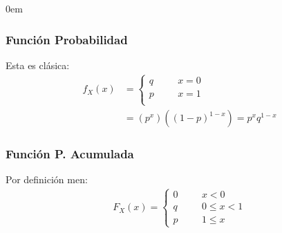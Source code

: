\documentclass[12pt, fleqn]{report}                             %
\newenvironment{SmallIndentation}[1][0.75em]                    %
        {\begin{adjustwidth}{#1}{}\begin{footnotesize}}             %
        {\end{footnotesize}\end{adjustwidth}}                       %
\newcommand \ForceColumnBreak   {\vfill\null\columnbreak}       %
\DeclareMathOperator \Space     {\quad}                         %
\theoremstyle{break}                                            %
\begin{document}
\begin{multicols}{2}
\begin{SmallIndentation}[0em]
                
                    \ForceColumnBreak

                    \subsubsection{Función Probabilidad}

                        Esta es clásica:
                        \begin{align*}
                            f_X(x) 
                                &= 
                                \begin{cases}
                                    q \Space& x = 0                     \\
                                    p \Space& x = 1                     \\
                                \end{cases}                             \\
                                &= (p^x) ((1-p)^{1-x}) = p^x q^{1-x}
                        \end{align*}


                    \subsubsection{Función P. Acumulada}

                        Por definición men:
                        \begin{align*}
                            F_X(x) = 
                                \begin{cases}
                                    0 \Space& x < 0             \\
                                    q \Space& 0 \leq x < 1      \\
                                    p \Space& 1 \leq x 
                                \end{cases}
                        \end{align*}



\end{SmallIndentation}
\end{multicols}
\end{document}
